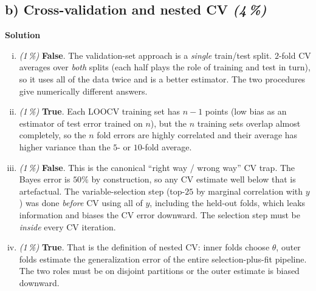 \documentclass[11pt,a4paper]{article}
\newcommand{\subpoints}[1]{\textit{(#1\,\%)}}
\newcommand{\sol}{\noindent\textbf{Solution}}
\begin{document}
\subsection*{b) Cross-validation and nested CV \subpoints{4}}
\sol{}
\begin{enumerate}[(i)]
  \item \subpoints{1} \textbf{False}. The validation-set approach is a \emph{single} train/test split.
        $2$-fold CV averages over \emph{both} splits (each half plays the role of training and test
        in turn), so it uses all of the data twice and is a better estimator. The two procedures
        give numerically different answers.
  \item \subpoints{1} \textbf{True}. Each LOOCV training set has $n-1$ points (low bias as an estimator
        of test error trained on $n$), but the $n$ training sets overlap almost completely, so the
        $n$ fold errors are highly correlated and their average has higher variance than the
        $5$- or $10$-fold average.
  \item \subpoints{1} \textbf{False}. This is the canonical ``right way / wrong way'' CV trap. The
        Bayes error is $50\%$ by construction, so any CV estimate well below that is artefactual.
        The variable-selection step (top-$25$ by marginal correlation with $y$) was done
        \emph{before} CV using all of $y$, including the held-out folds, which leaks information
        and biases the CV error downward. The selection step must be \emph{inside} every CV
        iteration.
  \item \subpoints{1} \textbf{True}. That is the definition of nested CV: inner folds choose
        $\theta$, outer folds estimate the generalization error of the entire selection-plus-fit
        pipeline. The two roles must be on disjoint partitions or the outer estimate is biased
        downward.
\end{enumerate}
\end{document}
